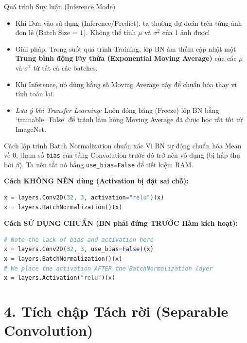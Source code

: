 \documentclass[aspectratio=169]{beamer}
\begin{document}
\begin{frame}{Quá trình Suy luận (Inference Mode)}
    \begin{itemize}
        \item Khi Đưa vào sử dụng (Inference/Predict), ta thường dự đoán trên từng ảnh đơn lẻ (Batch Size = 1). Không thể tính $\mu$ và $\sigma^2$ của 1 ảnh được!
        \item Giải pháp: Trong suốt quá trình Training, lớp BN âm thầm cập nhật một \textbf{Trung bình động lũy thừa (Exponential Moving Average)} của các $\mu$ và $\sigma^2$ từ tất cả các batches.
        \item Khi Inference, nó dùng hằng số Moving Average này để chuẩn hóa thay vì tính toán lại.
        \item \textit{Lưu ý khi Transfer Learning:} Luôn đóng băng (Freeze) lớp BN bằng `trainable=False` để tránh làm hỏng Moving Average đã được học rất tốt từ ImageNet.
    \end{itemize}
\end{frame}

\begin{frame}[fragile]{Cách lập trình Batch Normalization chuẩn xác}
Vì BN tự động chuẩn hóa Mean về 0, tham số \texttt{bias} của tầng Convolution trước đó trở nên vô dụng (bị hấp thụ bởi $\beta$). Ta nên tắt nó bằng \texttt{use\_bias=False} để tiết kiệm RAM.

\textbf{Cách KHÔNG NÊN dùng (Activation bị đặt sai chỗ):}
\begin{lstlisting}[language=Python]
x = layers.Conv2D(32, 3, activation="relu")(x)
x = layers.BatchNormalization()(x)
\end{lstlisting}

\textbf{Cách SỬ DỤNG CHUẨN (BN phải đứng TRƯỚC Hàm kích hoạt):}
\begin{lstlisting}[language=Python]
# Note the lack of bias and activation here
x = layers.Conv2D(32, 3, use_bias=False)(x)
x = layers.BatchNormalization()(x)
# We place the activation AFTER the BatchNormalization layer
x = layers.Activation("relu")(x)
\end{lstlisting}
\end{frame}

\section{4. Tích chập Tách rời (Separable Convolution)}
\end{document}
